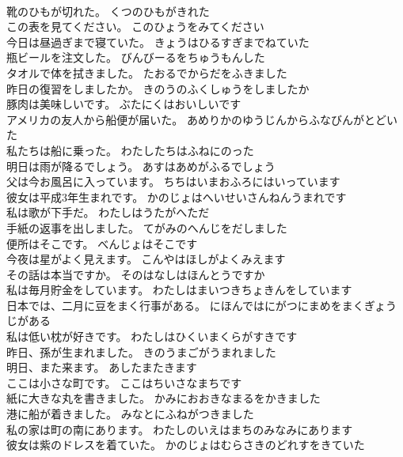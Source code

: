 \documentclass[8pt]{extreport}
\begin{document}
\begin{CJK}{UTF8}{min}
\\	靴のひもが切れた。	くつのひもがきれた 
\\	この表を見てください。	このひょうをみてください 
\\	今日は昼過ぎまで寝ていた。	きょうはひるすぎまでねていた 
\\	瓶ビールを注文した。	びんびーるをちゅうもんした 
\\	タオルで体を拭きました。	たおるでからだをふきました 
\\	昨日の復習をしましたか。	きのうのふくしゅうをしましたか 
\\	豚肉は美味しいです。	ぶたにくはおいしいです 
\\	アメリカの友人から船便が届いた。	あめりかのゆうじんからふなびんがとどいた 
\\	私たちは船に乗った。	わたしたちはふねにのった 
\\	明日は雨が降るでしょう。	あすはあめがふるでしょう 
\\	父は今お風呂に入っています。	ちちはいまおふろにはいっています 
\\	彼女は平成3年生まれです。	かのじょはへいせいさんねんうまれです 
\\	私は歌が下手だ。	わたしはうたがへただ 
\\	手紙の返事を出しました。	てがみのへんじをだしました 
\\	便所はそこです。	べんじょはそこです 
\\	今夜は星がよく見えます。	こんやはほしがよくみえます 
\\	その話は本当ですか。	そのはなしはほんとうですか 
\\	私は毎月貯金をしています。	わたしはまいつきちょきんをしています 
\\	日本では、二月に豆をまく行事がある。	にほんではにがつにまめをまくぎょうじがある 
\\	私は低い枕が好きです。	わたしはひくいまくらがすきです 
\\	昨日、孫が生まれました。	きのうまごがうまれました 
\\	明日、また来ます。	あしたまたきます 
\\	ここは小さな町です。	ここはちいさなまちです 
\\	紙に大きな丸を書きました。	かみにおおきなまるをかきました 
\\	港に船が着きました。	みなとにふねがつきました 
\\	私の家は町の南にあります。	わたしのいえはまちのみなみにあります 
\\	彼女は紫のドレスを着ていた。	かのじょはむらさきのどれすをきていた 

\end{CJK}
\end{document}
